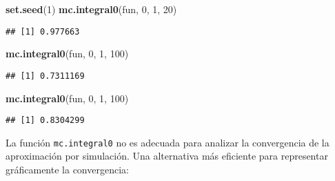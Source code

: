 \documentclass[
]{book}
\newenvironment{Shaded}{\begin{snugshade}}{\end{snugshade}}
\newcommand{\DecValTok}[1]{\textcolor[rgb]{0.00,0.00,0.81}{#1}}
\newcommand{\KeywordTok}[1]{\textcolor[rgb]{0.13,0.29,0.53}{\textbf{#1}}}
\newcommand{\NormalTok}[1]{#1}
\theoremstyle{break}
\theoremstyle{definition}
\theoremstyle{definition}
\theoremstyle{definition}
\theoremstyle{remark}
\begin{document}
\begin{Shaded}
\begin{Highlighting}[]
\KeywordTok{set.seed}\NormalTok{(}\DecValTok{1}\NormalTok{)}
\KeywordTok{mc.integral0}\NormalTok{(fun, }\DecValTok{0}\NormalTok{, }\DecValTok{1}\NormalTok{, }\DecValTok{20}\NormalTok{)}
\end{Highlighting}
\end{Shaded}

\begin{verbatim}
## [1] 0.977663
\end{verbatim}

\begin{Shaded}
\begin{Highlighting}[]
\KeywordTok{mc.integral0}\NormalTok{(fun, }\DecValTok{0}\NormalTok{, }\DecValTok{1}\NormalTok{, }\DecValTok{100}\NormalTok{)}
\end{Highlighting}
\end{Shaded}

\begin{verbatim}
## [1] 0.7311169
\end{verbatim}

\begin{Shaded}
\begin{Highlighting}[]
\KeywordTok{mc.integral0}\NormalTok{(fun, }\DecValTok{0}\NormalTok{, }\DecValTok{1}\NormalTok{, }\DecValTok{100}\NormalTok{)}
\end{Highlighting}
\end{Shaded}

\begin{verbatim}
## [1] 0.8304299
\end{verbatim}

La función \texttt{mc.integral0} no es adecuada para analizar la convergencia
de la aproximación por simulación.
Una alternativa más eficiente para representar gráficamente la convergencia:
\end{document}
